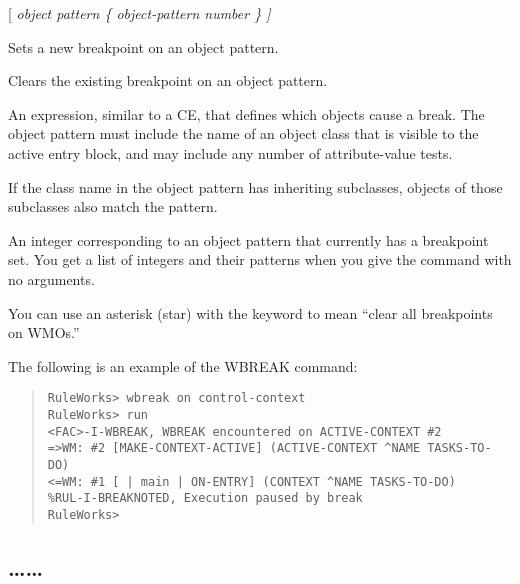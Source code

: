 {{\Format

 [  \it{object pattern}  \{
\it{object-pattern} \it{number} \co* \} ]

\begin{arguments}
\item[\co{ON}]

  Sets a new breakpoint on an object pattern.

\item[\co{OFF}]

  Clears the existing breakpoint on an object pattern.

\item[object-pattern]

  An expression, similar to a CE, that defines which objects cause a
  break. The object pattern must include the name of an object class
  that is visible to the active entry block, and may include any
  number of attribute-value tests.

  If the class name in the object pattern has inheriting subclasses,
  objects of those subclasses also match the pattern.

\item[number]

  An integer corresponding to an object pattern that currently has a
  breakpoint set. You get a list of integers and their patterns when
  you give the  command with no arguments.

\item[\co{*}]

  You can use an asterisk (star) with the  keyword to mean
  ``clear all breakpoints on WMOs.''
\end{arguments}

\Example

The following is an example of the WBREAK command:

\begin{quote}
\begin{verbatim}
RuleWorks> wbreak on control-context
RuleWorks> run
<FAC>-I-WBREAK, WBREAK encountered on ACTIVE-CONTEXT #2
=>WM: #2 [MAKE-CONTEXT-ACTIVE] (ACTIVE-CONTEXT ^NAME TASKS-TO-DO)
<=WM: #1 [ | main | ON-ENTRY] (CONTEXT ^NAME TASKS-TO-DO)
%RUL-I-BREAKNOTED, Execution paused by break
RuleWorks>
\end{verbatim}
\end{quote}

\subsection{\ldots{}\ldots}

}}
